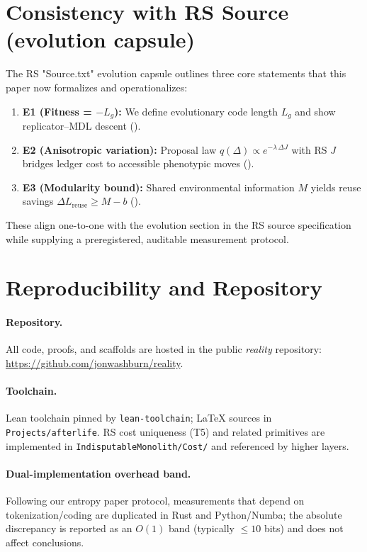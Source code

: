 \documentclass[11pt,a4paper]{article}
\begin{document}
\section{Consistency with RS Source (evolution capsule)}
\label{sec:rs-source}
The RS "Source.txt" evolution capsule outlines three core statements that this paper now formalizes and operationalizes:
\begin{enumerate}[leftmargin=*]
  \item \textbf{E1 (Fitness = $-L_g$):} We define evolutionary code length $L_g$ and show replicator--MDL descent ().
  \item \textbf{E2 (Anisotropic variation):} Proposal law $q(\Delta)\propto e^{-\lambda\,\Delta J}$ with RS $J$ bridges ledger cost to accessible phenotypic moves ().
  \item \textbf{E3 (Modularity bound):} Shared environmental information $M$ yields reuse savings $\Delta L_{\text{reuse}}\ge M-b$ ().
\end{enumerate}
These align one-to-one with the evolution section in the RS source specification while supplying a preregistered, auditable measurement protocol.

\section{Reproducibility and Repository}
\label{sec:repro}
\paragraph{Repository.} All code, proofs, and scaffolds are hosted in the public \emph{reality} repository: \url{https://github.com/jonwashburn/reality}.

\paragraph{Toolchain.} Lean toolchain pinned by \texttt{lean-toolchain}; LaTeX sources in \texttt{Projects/afterlife}. RS cost uniqueness (T5) and related primitives are implemented in \texttt{IndisputableMonolith/Cost/} and referenced by higher layers.

\paragraph{Dual-implementation overhead band.} Following our entropy paper protocol, measurements that depend on tokenization/coding are duplicated in Rust and Python/Numba; the absolute discrepancy is reported as an $O(1)$ band (typically $\le 10$ bits) and does not affect conclusions.
\end{document}
